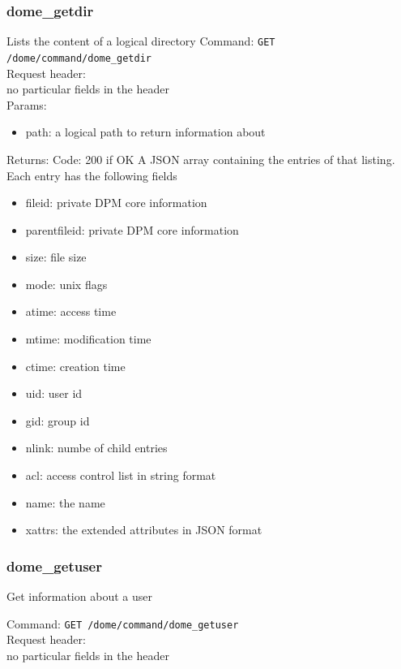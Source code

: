\documentclass[a4paper,10pt]{scrreprt}
\begin{document}
\subsubsection{dome\_getdir}

Lists the content of a logical directory
Command:
\lstinline"GET /dome/command/dome_getdir"\\

Request header:\\
no particular fields in the header\\

Params:
\begin{itemize}
 \item path: a logical path to return information about

\end{itemize}

Returns:
Code: 200 if OK
A JSON array containing the entries of that listing. Each entry has the following fields
\begin{itemize}
 \item fileid: private DPM core information
 \item parentfileid: private DPM core information
 \item size: file size
 \item mode: unix flags
 \item atime: access time
 \item mtime: modification time
 \item ctime: creation time
 \item uid: user id
 \item gid: group id
 \item nlink: numbe of child entries
 \item acl: access control list in string format
 \item name: the name
 \item xattrs: the extended attributes in JSON format
\end{itemize}


\subsubsection{dome\_getuser}

Get information about a user

Command:
\lstinline"GET /dome/command/dome_getuser"\\

Request header:\\
no particular fields in the header\\
\end{document}
